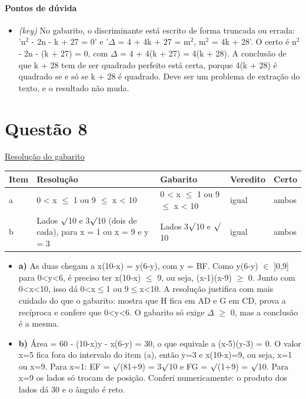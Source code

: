 \documentclass{article}%
\begin{document}
\paragraph{Pontos de dúvida}%
\begin{itemize}%
\item%
\textit{(key)} No gabarito, o discriminante está escrito de forma truncada ou errada: 'n$^2$ - 2n - k + 27 = 0' e '$\Delta$ = 4 + 4k + 27 = m$^2$, m$^2$ = 4k + 28'. O certo é n$^2$ - 2n - (k + 27) = 0, com $\Delta$ = 4 + 4(k + 27) = 4(k + 28). A conclusão de que k + 28 tem de ser quadrado perfeito está certa, porque 4(k + 28) é quadrado se e só se k + 28 é quadrado. Deve ser um problema de extração do texto, e o resultado não muda.%
\end{itemize}%
\section*{Questão 8}%
\href{https://poliedroresolve.sistemapoliedro.com.br/vestibulares/ita/2027/ita-2-fase-dia-1-20-10-2026-2-fase-dia-1/dissertativa-8-matematica-2-fase-dia-1-ita-2027}{Resolução do gabarito}\par\smallskip%
\begin{longtable}{@{}p{} p{} p{} p{} p{}@{}}\toprule Item & Resolução & Gabarito & Veredito & Certo \\ \midrule
a & 0 < x $\leq$ 1 ou 9 $\leq$ x < 10 & 0 < x $\leq$ 1 ou 9 $\leq$ x < 10 & igual & ambos \\
b & Lados $\surd$10 e 3$\surd$10 (dois de cada), para x = 1 ou x = 9 e y = 3 & Lados 3$\surd$10 e $\surd$10 & igual & ambos \\
\bottomrule\end{longtable}%
\begin{itemize}%
\item%
\textbf{a)} As duas chegam a x(10-x) = y(6-y), com y = BF. Como y(6-y) $\in$ {]}0,9{]} para 0<y<6, é preciso ter x(10-x) $\leq$ 9, ou seja, (x-1)(x-9) $\geq$ 0. Junto com 0<x<10, isso dá 0<x$\leq$1 ou 9$\leq$x<10. A resolução justifica com mais cuidado do que o gabarito: mostra que H fica em AD e G em CD, prova a recíproca e confere que 0<y<6. O gabarito só exige $\Delta$ $\geq$ 0, mas a conclusão é a mesma.%
\item%
\textbf{b)} Área = 60 - (10-x)y - x(6-y) = 30, o que equivale a (x-5)(y-3) = 0. O valor x=5 fica fora do intervalo do item (a), então y=3 e x(10-x)=9, ou seja, x=1 ou x=9. Para x=1: EF = $\surd$(81+9) = 3$\surd$10 e FG = $\surd$(1+9) = $\surd$10. Para x=9 os lados só trocam de posição. Conferi numericamente: o produto dos lados dá 30 e o ângulo é reto.%
\end{itemize}%
\end{document}
